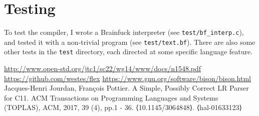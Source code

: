 \documentclass[12pt]{article}
\begin{document}

\section{Testing}
To test the compiler, I wrote a Brainfuck interpreter (see
\texttt{test/bf\_interp.c}), and tested it with a non-trivial program (see
\texttt{test/text.bf}). There are also some other tests in the \texttt{test}
directory, each directed at some specific language feature.

\begin{thebibliography}{1}
 \url{http://www.open-std.org/jtc1/sc22/wg14/www/docs/n1548.pdf}
 \url{https://github.com/westes/flex}
 \url{https://www.gnu.org/software/bison/bison.html}
 Jacques-Henri Jourdan, François Pottier. A Simple, Possibly Correct LR Parser for C11. ACM Transactions on Programming Languages and Systems (TOPLAS), ACM, 2017, 39 (4), pp.1 - 36. ⟨10.1145/3064848⟩. ⟨hal-01633123⟩
\end{thebibliography}
\end{document}
